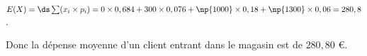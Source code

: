 \begin{enumerate}
\begin{enumerate}
$E(X)=\ds\sum (x_i\times p_i) = 0\times 0,684 + 300\times 0,076 + \np{1000}\times 0,18 + \np{1300}\times 0,06 =280,8$.

Donc la dépense moyenne d'un client entrant dans le magasin est de $280,80$ \euro.
	\end{enumerate}
\end{enumerate}

\vspace{0.5cm}

